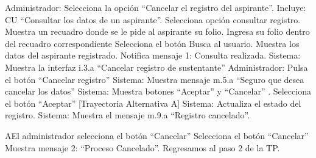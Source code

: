 \begin{UCtrayectoria}
		
	

	
	
	\UCpaso [\UCactor]Administrador: Selecciona la opción “Cancelar el registro del aspirante”.
	\UCpaso [\UCsist]Incluye: CU “Consultar los datos de un aspirante”.
	\UCpaso [\UCactor]Selecciona opción consultar registro.
	\UCpaso [\UCsist]Muestra un recuadro donde se le pide al aspirante su folio.
	\UCpaso [\UCactor]Ingresa su folio dentro del recuadro correspondiente
	\UCpaso [\UCactor]Selecciona el botón 
	\UCpaso [\UCsist]Busca al usuario.
	\UCpaso [\UCsist]Muestra los datos del aspirante registrado.
	\UCpaso [\UCsist]Notifica mensaje 1: Consulta realizada.
	\UCpaso [\UCsist]Sistema: Muestra la interfaz  i.3.a “Cancelar registro de sustentante”
	\UCpaso [\UCactor]Administrador: Pulsa el botón “Cancelar registro” 
	\UCpaso [\UCsist]Sistema: Muestra mensaje m.5.a “Seguro que desea cancelar los datos”
	\UCpaso [\UCsist]Sistema: Muestra botones “Aceptar” y “Cancelar” .
	\UCpaso [\UCactor]Selecciona el botón “Aceptar” [Trayectoria Alternativa A] 
	\UCpaso [\UCsist]Sistema: Actualiza el estado del registro.
	\UCpaso [\UCsist]Sistema: Muestra el mensaje m.9.a  “Registro cancelado”.
\end{UCtrayectoria}



\begin{UCtrayectoriaA}{A}{El administrador selecciona el botón “Cancelar” }
	\UCpaso [\UCactor]Selecciona el botón “Cancelar”  
	\UCpaso [\UCsist] Muestra mensaje 2:  “Proceso Cancelado”.
	\UCpaso [\UCsist] Regresamos al paso 2 de la TP.		

\end{UCtrayectoriaA}



